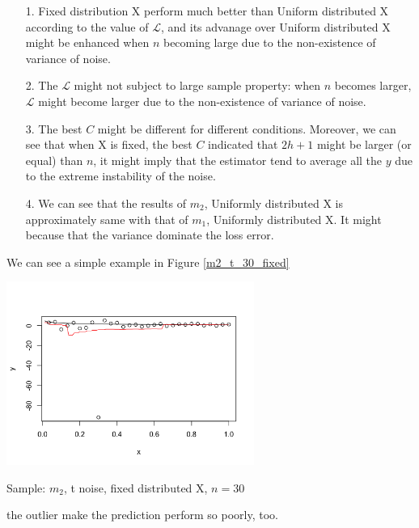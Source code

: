 \documentclass[twoside]{article}
\begin{document}
\begin{itemize}
  \item[1.] Fixed distribution X perform much better than Uniform distributed X according to the value of $\mathcal{L}$, and its advanage over Uniform distributed X might be enhanced when $n$ becoming large due to the non-existence of variance of noise.
  \item[2.] The $\mathcal{L}$ might not subject to large sample property: when $n$ becomes larger, $\mathcal{L}$ might become larger due to the non-existence of variance of noise.
  \item[3.] The best $C$ might be different for different conditions. Moreover, we can see that when X is fixed, the best $C$ indicated that $2h+1$ might be larger (or equal) than $n$, it might imply that the estimator tend to average all the $y$ due to the extreme instability of the noise.
  \item[4.] We can see that the results of $m_2$, Uniformly distributed X is approximately same with that of $m_1$, Uniformly distributed X. It might because that the variance dominate the loss error.
\end{itemize}

We can see a simple example in Figure \ref{m2_t_30_fixed}

\begin{center}
\makeatletter
\def\@captype{figure}
\makeatother
\includegraphics [height=6cm]{code/m2_t_30_fixed.png}
\caption{Sample: $m_2$, t noise, fixed distributed X, $n=30$}
\label{m2_t_30_fixed}
\end{center}

the outlier make the prediction perform so poorly, too.
\end{document}
